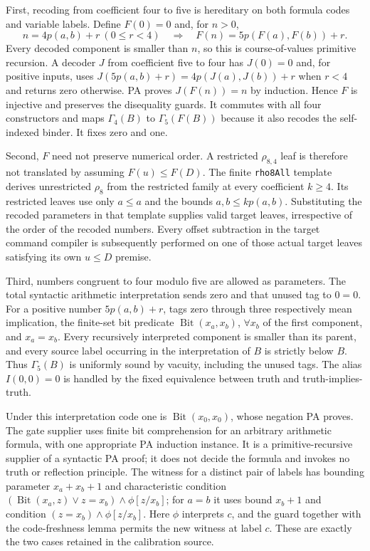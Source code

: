 First, recoding from coefficient four to five is hereditary on both
formula codes and variable labels. Define $F(0)=0$ and, for $n>0$,
\[
 n=4p(a,b)+r\ (0\leq r<4)\quad\Longrightarrow\quad
 F(n)=5p(F(a),F(b))+r.
\]
Every decoded component is smaller than $n$, so this is course-of-values
primitive recursion. A decoder $J$ from coefficient five to four has
$J(0)=0$ and, for positive inputs, uses
$J(5p(a,b)+r)=4p(J(a),J(b))+r$ when $r<4$ and returns zero otherwise.
PA proves $J(F(n))=n$ by induction. Hence $F$ is injective and preserves
the disequality guards. It commutes with all four constructors and maps
$\Gamma_4(B)$ to $\Gamma_5(F(B))$ because it also recodes the self-indexed
binder. It fixes zero and one.

Second, $F$ need not preserve numerical order. A restricted
$\rho_{8,4}$ leaf is therefore not translated by assuming
$F(u)\leq F(D)$. The finite \texttt{rho8All} template derives
unrestricted $\rho_8$ from the restricted family at every coefficient
$k\geq4$. Its restricted leaves use only $a\leq a$ and the bounds
$a,b\leq kp(a,b)$. Substituting the recoded parameters in that template
supplies valid target leaves, irrespective of the order of the recoded
numbers. Every offset subtraction in the target command compiler is
subsequently performed on one of those actual target leaves satisfying
its own $u\leq D$ premise.

Third, numbers congruent to four modulo five are allowed as
parameters. The total syntactic arithmetic interpretation sends zero
and that unused tag to $0=0$. For a positive number $5p(a,b)+r$, tags
zero through three respectively mean implication, the finite-set bit
predicate $\operatorname{Bit}(x_a,x_b)$, $\forall x_b$ of the first
component, and $x_a=x_b$. Every recursively interpreted component is
smaller than its parent, and every source label occurring in the
interpretation of $B$ is strictly below $B$. Thus $\Gamma_5(B)$ is
uniformly sound by vacuity, including the unused tags. The alias
$I(0,0)=0$ is handled by the fixed equivalence between truth and
truth-implies-truth.

Under this interpretation code one is $\operatorname{Bit}(x_0,x_0)$,
whose negation PA proves. The gate supplier uses finite bit comprehension
for an arbitrary arithmetic formula, with one appropriate PA induction
instance. It is a primitive-recursive supplier of a syntactic PA proof;
it does not decide the formula and invokes no truth or reflection
principle. The witness for a distinct pair of labels has bounding
parameter $x_a+x_b+1$ and characteristic condition
$(\operatorname{Bit}(x_a,z)\vee z=x_b)\wedge\phi[z/x_b]$;
for $a=b$ it uses bound $x_b+1$ and condition
$(z=x_b)\wedge\phi[z/x_b]$. Here $\phi$ interprets $c$,
and the guard together with the code-freshness lemma permits the
new witness at label $c$. These are exactly the two cases retained
in the calibration source.

